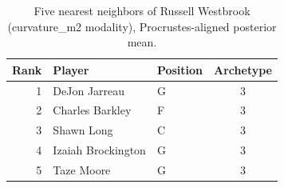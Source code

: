 \begin{table}[htbp]
  \centering\small
  \begin{tabular}{rllc}
    \toprule
    Rank & Player & Position & Archetype \\
    \midrule
    1 & DeJon Jarreau & G & 3 \\
    2 & Charles Barkley & F & 3 \\
    3 & Shawn Long & C & 3 \\
    4 & Izaiah Brockington & G & 3 \\
    5 & Taze Moore & G & 3 \\
    \bottomrule
  \end{tabular}
  \caption{Five nearest neighbors of Russell Westbrook (curvature_m2 modality), Procrustes-aligned posterior mean.}
  \label{tab:Russell_Westbrook_neighbors_curvature_m2}
\end{table}

